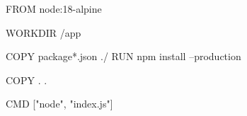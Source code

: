FROM node:18-alpine

WORKDIR /app

COPY package*.json ./
RUN npm install --production

COPY . .

CMD ["node", "index.js"]

